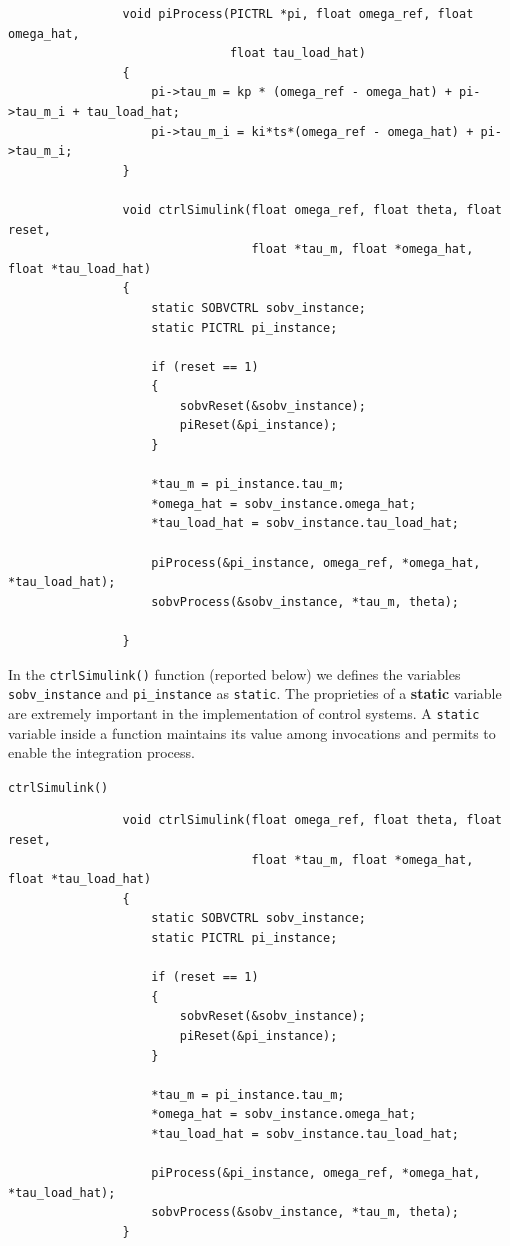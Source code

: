 \documentclass[12pt,a4paper,oneside]{book}
\begin{document}
\begin{onehalfspace}
\begin{mybox}
{\begin{verbatim}
				void piProcess(PICTRL *pi, float omega_ref, float omega_hat, 
				               float tau_load_hat)
				{        
					pi->tau_m = kp * (omega_ref - omega_hat) + pi->tau_m_i + tau_load_hat; 
					pi->tau_m_i = ki*ts*(omega_ref - omega_hat) + pi->tau_m_i;
				}
				
				void ctrlSimulink(float omega_ref, float theta, float reset, 
				                  float *tau_m, float *omega_hat, float *tau_load_hat)
				{
					static SOBVCTRL sobv_instance; 
					static PICTRL pi_instance; 
					
					if (reset == 1)
					{
						sobvReset(&sobv_instance);
						piReset(&pi_instance);
					}
					
					*tau_m = pi_instance.tau_m;
					*omega_hat = sobv_instance.omega_hat;
					*tau_load_hat = sobv_instance.tau_load_hat;
					
					piProcess(&pi_instance, omega_ref, *omega_hat, *tau_load_hat);   
					sobvProcess(&sobv_instance, *tau_m, theta);
					
				}
		\end{verbatim}}
	\end{mybox}
	In the \texttt{ctrlSimulink()} function (reported below) we defines the variables \texttt{sobv\_instance} and \texttt{pi\_instance} as \texttt{static}. The proprieties of a \textbf{static} variable are extremely important in the implementation of control systems. A \texttt{static} variable inside a function maintains its value among invocations and permits to enable the integration process.
	\begin{mybox}
			\begin{center}
					{\selectfont \verb+ctrlSimulink()+}
				\end{center}
		{\selectfont \footnotesize \noindent
			\begin{verbatim}
				void ctrlSimulink(float omega_ref, float theta, float reset, 
				                  float *tau_m, float *omega_hat, float *tau_load_hat)
				{
				    static SOBVCTRL sobv_instance;
				    static PICTRL pi_instance; 
					
					if (reset == 1)
					{
					    sobvReset(&sobv_instance);
					    piReset(&pi_instance);
					}
					
					*tau_m = pi_instance.tau_m;
					*omega_hat = sobv_instance.omega_hat;
					*tau_load_hat = sobv_instance.tau_load_hat;
					
					piProcess(&pi_instance, omega_ref, *omega_hat, *tau_load_hat);   
					sobvProcess(&sobv_instance, *tau_m, theta);
				}
		\end{verbatim}}
	\end{mybox}


\end{onehalfspace}
\end{document}
